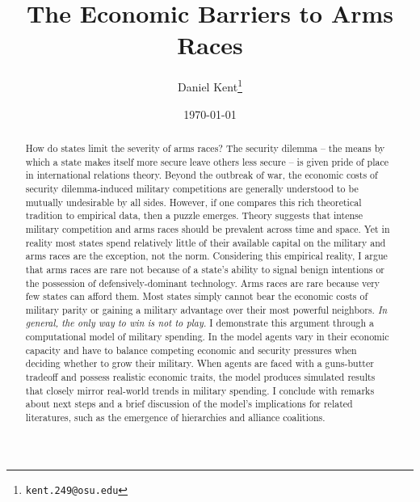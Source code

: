 \documentclass[12pt]{article}
\begin{document}
\title{\Large{The Economic Barriers to Arms Races}}
\author{
    Daniel Kent\footnote{\texttt{kent.249@osu.edu}}
    }
\date{\today}
\maketitle


\singlespacing

\begin{abstract} 

\noindent How do states limit the severity of arms races? The security dilemma -- the means by which a state makes itself more secure leave others less secure -- is given pride of place in international relations theory. Beyond the outbreak of war, the economic costs of security dilemma-induced military competitions are generally understood to be mutually undesirable by all sides. 
However, if one compares this rich theoretical tradition to empirical data, then a puzzle emerges. Theory suggests that intense military competition and arms races should be prevalent across time and space. 
Yet in reality most states spend relatively little of their available capital on the military and arms races are the exception, not the norm. 
Considering this empirical reality, I argue that arms races are rare not because of a state's ability to signal benign intentions or the possession of defensively-dominant technology. Arms races are rare because very few states can afford them. Most states simply cannot bear the economic costs of military parity or gaining a military advantage over their most powerful neighbors. \emph{In general, the only way to win is not to play.} 
I demonstrate this argument through a computational model of military spending. In the model agents vary in their economic capacity and have to balance competing economic and security pressures when deciding whether to grow their military. When agents are faced with a guns-butter tradeoff and possess realistic economic traits, the model produces simulated results that closely mirror real-world trends in military spending. I conclude with remarks about next steps and a brief discussion of the model's implications for related literatures, such as the emergence of hierarchies and alliance coalitions. %

\end{abstract}
\end{document}
